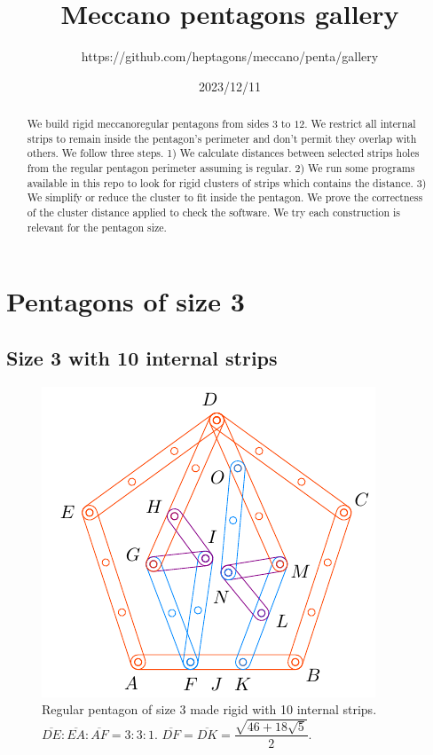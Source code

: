 \documentclass[11pt]{article}
\title{Meccano pentagons gallery}
\author{https://github.com/heptagons/meccano/penta/gallery}
\date{2023/12/11}
\begin{document}
\maketitle
\begin{abstract}
We build rigid meccano\meccanoref regular pentagons from sides $3$ to $12$. We restrict all internal strips to remain inside the pentagon's perimeter and don't permit they overlap with others. We follow three steps. 1) We calculate distances between selected strips holes from the regular pentagon perimeter assuming is regular. 2) We run some programs available in this repo to look for rigid clusters of strips which contains the distance. 3) We simplify or reduce the cluster to fit inside the pentagon. We prove the correctness of the cluster distance applied to check the software. We try each construction is relevant for the pentagon size.
\end{abstract}


\section{Pentagons of size 3}

\subsection{Size 3 with 10 internal strips}

\begin{figure}[H]
\centering
\includegraphics[scale=1.2]{3/penta3-10a}
\caption{Regular pentagon of size 3 made rigid with 10 internal strips. $\overline{DE}:\overline{EA}:\overline{AF} = 3:3:1$. $\overline{DF} = \overline{DK} = \dfrac{\sqrt{46+18\sqrt5}}2$.}
\label{fig:penta3-10a}
\end{figure}
\end{document}
